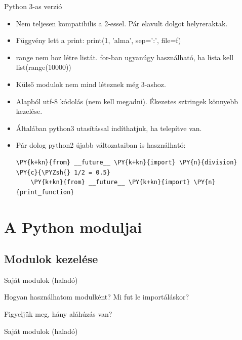 \begin{frame}[fragile]
{Python 3-as verzió}

\begin{itemize}
    \item Nem teljesen kompatibilis a 2-essel. Pár elavult dolgot helyreraktak.

    \item Függvény lett a print: print(1, 'alma', sep=':', file=f)

    \item range nem hoz létre listát.
        for-ban ugyanúgy használható, ha lista kell
        list(range(10000))

    \item Külső modulok nem mind léteznek még 3-ashoz.

    \item Alapból utf-8 kódolás (nem kell megadni). Ékezetes sztringek könnyebb kezelése.

    \item Általában python3 utasítással indíthatjuk, ha telepítve van.

    \item Pár dolog python2 újabb változataiban is használható:
\begin{Verbatim}[commandchars=\\\{\}]
    \PY{k+kn}{from} __future__ \PY{k+kn}{import} \PY{n}{division} \PY{c}{\PYZsh{} 1/2 = 0.5}
    \PY{k+kn}{from} __future__ \PY{k+kn}{import} \PY{n}{print_function}
\end{Verbatim}
\end{itemize}
\end{frame}

\section{A Python moduljai}
\subsection{Modulok kezelése}
\begin{frame}[fragile]
  {Saját modulok (haladó)}
      
      \vfill

      Hogyan használhatom modulként? Mi fut le importáláskor?

      \vfill
      Figyeljük meg, hány aláhúzás van?
\end{frame}

\begin{frame}[fragile]
  {Saját modulok (haladó)}
      
	\vfill
      
\end{frame}

